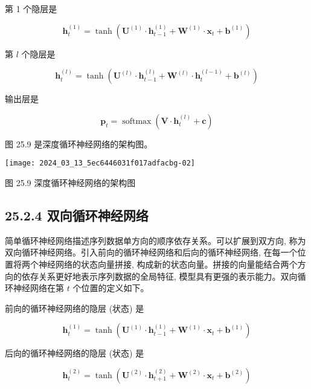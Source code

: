 \documentclass[10pt]{article}
\begin{document}
第 1 个隐层是


\begin{equation*}
\boldsymbol{h}_{t}^{(1)}=\tanh \left(\boldsymbol{U}^{(1)} \cdot \boldsymbol{h}_{t-1}^{(1)}+\boldsymbol{W}^{(1)} \cdot \boldsymbol{x}_{t}+\boldsymbol{b}^{(1)}\right) \tag{25.32}
\end{equation*}


第 $l$ 个隐层是


\begin{equation*}
\boldsymbol{h}_{t}^{(l)}=\tanh \left(\boldsymbol{U}^{(l)} \cdot \boldsymbol{h}_{t-1}^{(l)}+\boldsymbol{W}^{(l)} \cdot \boldsymbol{h}_{t}^{(l-1)}+\boldsymbol{b}^{(l)}\right) \tag{25.33}
\end{equation*}


输出层是


\begin{equation*}
\boldsymbol{p}_{t}=\operatorname{softmax}\left(\boldsymbol{V} \cdot \boldsymbol{h}_{t}^{(l)}+\boldsymbol{c}\right) \tag{25.34}
\end{equation*}


图 25.9 是深度循环神经网络的架构图。

\begin{center}
\texttt{[image: 2024\_03\_13\_5ec6446031f017adfacbg-02]}
\end{center}

图 25.9 深度循环神经网络的架构图

\subsection*{25.2.4 双向循环神经网络}
简单循环神经网络描述序列数据单方向的顺序依存关系。可以扩展到双方向, 称为双向循环神经网络。引入前向的循环神经网络和后向的循环神经网络, 在每一个位置将两个神经网络的状态向量拼接, 构成新的状态向量。拼接的向量能结合两个方向的依存关系更好地表示序列数据的全局特征, 模型具有更强的表示能力。双向循环神经网络在第 $t$ 个位置的定义如下。

前向的循环神经网络的隐层 (状态) 是


\begin{equation*}
\boldsymbol{h}_{t}^{(1)}=\tanh \left(\boldsymbol{U}^{(1)} \cdot \boldsymbol{h}_{t-1}^{(1)}+\boldsymbol{W}^{(1)} \cdot \boldsymbol{x}_{t}+\boldsymbol{b}^{(1)}\right) \tag{25.35}
\end{equation*}


后向的循环神经网络的隐层 (状态) 是


\begin{equation*}
\boldsymbol{h}_{t}^{(2)}=\tanh \left(\boldsymbol{U}^{(2)} \cdot \boldsymbol{h}_{t+1}^{(2)}+\boldsymbol{W}^{(2)} \cdot \boldsymbol{x}_{t}+\boldsymbol{b}^{(2)}\right) \tag{25.36}
\end{equation*}
\end{document}
